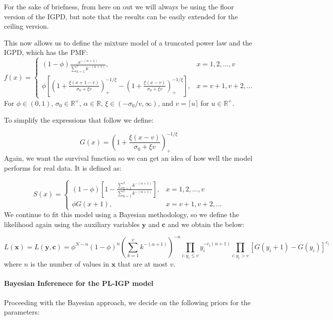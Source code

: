 \documentclass[
]{article}
\let\oldparagraph\paragraph
\renewcommand{\paragraph}[1]{\oldparagraph{#1}\mbox{}}
\begin{document}
For the sake of briefness, from here on out we will always be using the
floor version of the IGPD, but note that the results can be easily
extended for the ceiling version.

This now allows us to define the mixture model of a truncated power law
and the IGPD, which has the PMF: \[
f(x) = 
\begin{cases}
(1-\phi)\frac{x^{-(\alpha+1)}}{\sum_{k=1}^v k^{-(\alpha+1)}},&x=1,2,\ldots,v\\
\phi\left[\left(1+\frac{\xi(x+1-v)}{\sigma_0 + \xi v}\right)_+^{-1/\xi} - \left(1+\frac{\xi(x-v)}{\sigma_0 + \xi v}\right)_+^{-1/\xi}\right], &x=v+1, v+2, \ldots
\end{cases}
\] For \(\phi\in(0,1)\), \(\sigma_0 \in \mathbb{R}^+\),
\(\alpha\in\mathbb{R}\), \(\xi \in (-\sigma_0/v, \infty)\), and
\(v=\lceil u \rceil\) for \(u \in \mathbb{R}^+\).

To simplify the expressions that follow we define:

\[
G(x) = \left(1+\frac{\xi(x-v)}{\sigma_0 + \xi v}\right)_+^{-1/\xi}
\] Again, we want the survival function so we can get an idea of how
well the model performs for real data. It is defined as:

\[
S(x) = \begin{cases}
(1-\phi)\left[1-\frac{\sum_{k=1}^xk^{-(\alpha+1)}}{\sum_{k=1}^v k^{-(\alpha+1)}}\right], &x=1,2,\ldots,v\\
\phi G(x+1),&x=v+1,v+2, \ldots
\end{cases}
\] We continue to fit this model using a Bayesian methodology, so we
define the likelihood again using the auxiliary variables
\(\boldsymbol{y}\) and \(\boldsymbol{c}\) and we obtain the below:

\[
L(\boldsymbol{x}) = L(\boldsymbol{y}, \boldsymbol{c}) = \phi^{N-n}(1-\phi)^n \left(\sum_{k=1}^v k^{-(\alpha+1)}\right)^{-n}\prod_{i:y_i\le v}y_i^{-c_i(\alpha+1)}\prod_{i:y_i>v}\left[G(y_i+1) - G(y_i)\right]^{c_i}
\] where \(n\) is the number of values in \(\boldsymbol{x}\) that are at
most \(v\).

\hypertarget{bayesian-inferenece-for-the-pl-igp-model}{%
\paragraph{Bayesian Inferenece for the PL-IGP
model}\label{bayesian-inferenece-for-the-pl-igp-model}}

Proceeding with the Bayesian approach, we decide on the following priors
for the parameters:
\end{document}
